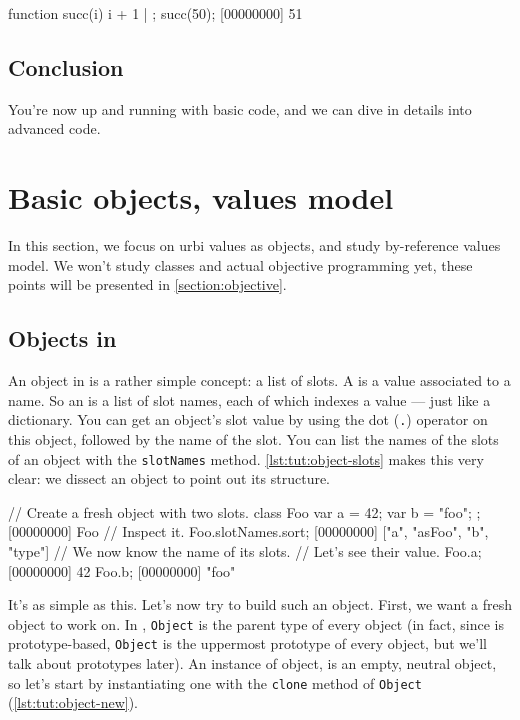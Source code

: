 \begin{urbiscript}
function succ(i) { i + 1 } | {};
succ(50);
[00000000] 51
\end{urbiscript}

\section{Conclusion}

You're now up and running with basic \us code, and we can dive in
details into advanced \us code.

\chapter{Basic objects, \us values model} %

In this section, we focus on urbi values as objects, and study \us
by-reference values model. We won't study classes and actual objective
programming yet, these points will be presented in
\autoref{section:objective}.

\section{Objects in \us}
\label{sec:tut:objects}
An object in \us is a rather simple concept: a list of slots. A
 is a value associated to a name. So an  is a
list of slot names, each of which indexes a value --- just like a
dictionary. You can get an object's slot value by using the dot
(\lstinline{.}) operator on this object, followed by the name of the
slot. You can list the names of the slots of an object with the
\lstinline{slotNames} method. \autoref{lst:tut:object-slots} makes
this very clear: we dissect an object to point out its structure.

\begin{urbiscript}[caption=Inspecting an \us object,label=lst:tut:object-slots]
// Create a fresh object with two slots.
class Foo { var a = 42; var b = "foo"; };
[00000000] Foo
// Inspect it.
Foo.slotNames.sort;
[00000000] ["a", "asFoo", "b", "type"]
// We now know the name of its slots.
// Let's see their value.
Foo.a;
[00000000] 42
Foo.b;
[00000000] "foo"
\end{urbiscript}

It's as simple as this. Let's now try to build such an object. First,
we want a fresh object to work on. In \us, \lstinline{Object} is the
parent type of every object (in fact, since \us is prototype-based,
\lstinline{Object} is the uppermost prototype of every object, but
we'll talk about prototypes later). An instance of object, is an
empty, neutral object, so let's start by instantiating one with the
\lstinline{clone} method of \lstinline{Object}
(\autoref{lst:tut:object-new}).

